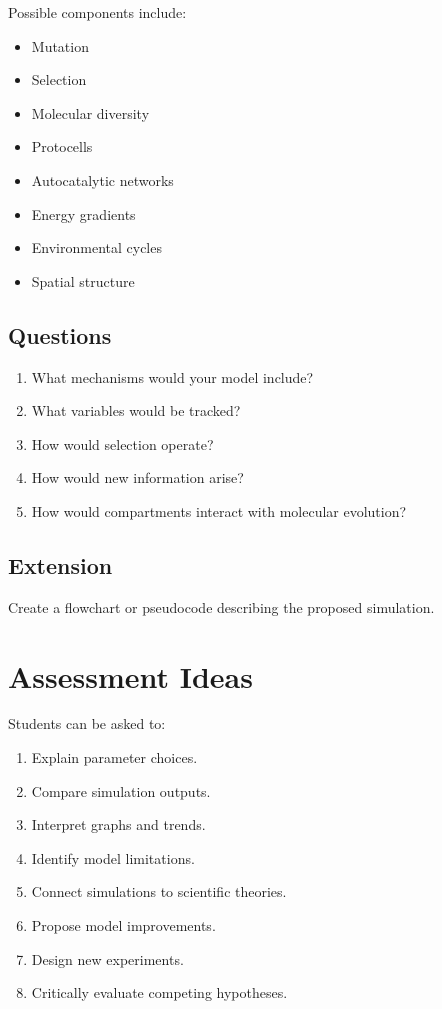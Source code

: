 \documentclass[
  oneside,
  openany]{book}
\providecommand{\tightlist}{%
  \setlength{\itemsep}{0pt}\setlength{\parskip}{0pt}}
\begin{document}
Possible components include:

\begin{itemize}
\tightlist
\item
  Mutation
\item
  Selection
\item
  Molecular diversity
\item
  Protocells
\item
  Autocatalytic networks
\item
  Energy gradients
\item
  Environmental cycles
\item
  Spatial structure
\end{itemize}

\subsection{Questions}\label{questions-6}

\begin{enumerate}
\def\labelenumi{\arabic{enumi}.}
\tightlist
\item
  What mechanisms would your model include?
\item
  What variables would be tracked?
\item
  How would selection operate?
\item
  How would new information arise?
\item
  How would compartments interact with molecular evolution?
\end{enumerate}

\subsection{Extension}\label{extension-6}

Create a flowchart or pseudocode describing the proposed simulation.

\section{Assessment Ideas}\label{assessment-ideas}

Students can be asked to:

\begin{enumerate}
\def\labelenumi{\arabic{enumi}.}
\tightlist
\item
  Explain parameter choices.
\item
  Compare simulation outputs.
\item
  Interpret graphs and trends.
\item
  Identify model limitations.
\item
  Connect simulations to scientific theories.
\item
  Propose model improvements.
\item
  Design new experiments.
\item
  Critically evaluate competing hypotheses.
\end{enumerate}
\end{document}
